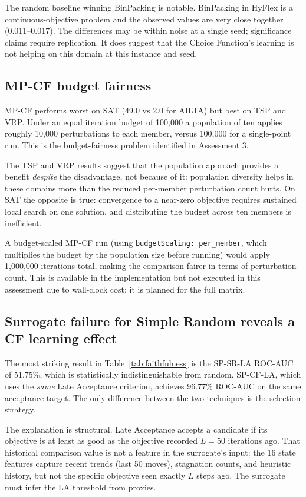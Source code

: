 \documentclass[11pt,a4paper]{article}
\begin{document}
The random baseline winning BinPacking is notable. BinPacking in HyFlex is a
continuous-objective problem and the observed values are very close together
(0.011--0.017). The differences may be within noise at a single seed; significance
claims require replication. It does suggest that the Choice Function's learning is
not helping on this domain at this instance and seed.

\subsection{MP-CF budget fairness}

MP-CF performs worst on SAT (49.0 vs 2.0 for AILTA) but best on TSP and VRP.
Under an equal iteration budget of 100,000 a population of ten applies roughly
10,000 perturbations to each member, versus 100,000 for a single-point run. This
is the budget-fairness problem identified in Assessment 3.

The TSP and VRP results suggest that the population approach provides a benefit
\emph{despite} the disadvantage, not because of it: population diversity helps
in these domains more than the reduced per-member perturbation count hurts. On SAT
the opposite is true: convergence to a near-zero objective requires sustained local
search on one solution, and distributing the budget across ten members is inefficient.

A budget-scaled MP-CF run (using \texttt{budgetScaling: per\_member}, which
multiplies the budget by the population size before running) would apply 1,000,000
iterations total, making the comparison fairer in terms of perturbation count.
This is available in the implementation but not executed in this assessment due to
wall-clock cost; it is planned for the full matrix.

\subsection{Surrogate failure for Simple Random reveals a CF learning effect}

The most striking result in Table~\ref{tab:faithfulness} is the SP-SR-LA ROC-AUC
of 51.75\%, which is statistically indistinguishable from random. SP-CF-LA, which
uses the \emph{same} Late Acceptance criterion, achieves 96.77\% ROC-AUC on the
same acceptance target. The only difference between the two techniques is the
selection strategy.

The explanation is structural. Late Acceptance accepts a candidate if its objective
is at least as good as the objective recorded $L = 50$ iterations ago. That historical
comparison value is not a feature in the surrogate's input: the 16 state features
capture recent trends (last 50 moves), stagnation counts, and heuristic history, but
not the specific objective seen exactly $L$ steps ago. The surrogate must infer the
LA threshold from proxies.
\end{document}

